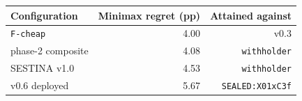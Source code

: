 \begin{tabular}{lrr}
\toprule
Configuration & Minimax regret (pp) & Attained against \\
\midrule
\texttt{F-cheap} & 4.00 & v0.3 \\
phase-2 composite & 4.08 & \texttt{withholder} \\
SESTINA v1.0 & 4.53 & \texttt{withholder} \\
v0.6 deployed & 5.67 & \texttt{SEALED:X01xC3f} \\
\bottomrule
\end{tabular}
